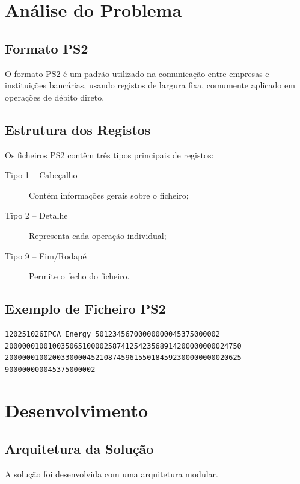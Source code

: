 \documentclass[11pt,a4paper]{report}
\begin{document}
\newpage

\chapter{Análise do Problema}
\section{Formato PS2}
O formato PS2 é um padrão utilizado na comunicação entre empresas e instituições bancárias, usando registos de largura fixa, comumente aplicado em operações de débito direto.

\section{Estrutura dos Registos}
Os ficheiros PS2 contêm três tipos principais de registos:
\begin{description}
    \item[Tipo 1 -- Cabeçalho] Contém informações gerais sobre o ficheiro;
    \item[Tipo 2 -- Detalhe] Representa cada operação individual;
    \item[Tipo 9 -- Fim/Rodapé] Permite o fecho do ficheiro.
\end{description}

\section{Exemplo de Ficheiro PS2}
\begin{lstlisting}[caption={Exemplo de ficheiro PS2}]
120251026IPCA Energy 50123456700000000045375000002
2000000100100350651000025874125423568914200000000024750
2000000100200330000452108745961550184592300000000020625
900000000045375000002
\end{lstlisting}

\newpage

\chapter{Desenvolvimento}
\section{Arquitetura da Solução}
A solução foi desenvolvida com uma arquitetura modular.
\end{document}
